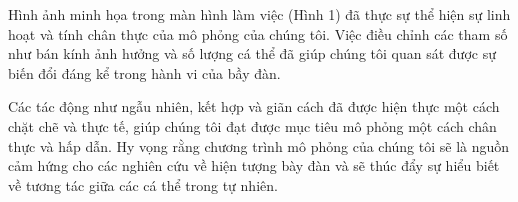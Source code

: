 \documentclass{article}
\begin{document}
Hình ảnh minh họa trong màn hình làm việc (Hình 1) đã thực sự thể hiện sự linh hoạt và tính chân thực của mô phỏng của chúng tôi. Việc điều chỉnh các tham số như bán kính ảnh hưởng và số lượng cá thể đã giúp chúng tôi quan sát được sự biến đổi đáng kể trong hành vi của bầy đàn.

Các tác động như ngẫu nhiên, kết hợp và giãn cách đã được hiện thực một cách chặt chẽ và thực tế, giúp chúng tôi đạt được mục tiêu mô phỏng một cách chân thực và hấp dẫn. Hy vọng rằng chương trình mô phỏng của chúng tôi sẽ là nguồn cảm hứng cho các nghiên cứu về hiện tượng bày đàn và sẽ thúc đẩy sự hiểu biết về tương tác giữa các cá thể trong tự nhiên.
\end{document}
